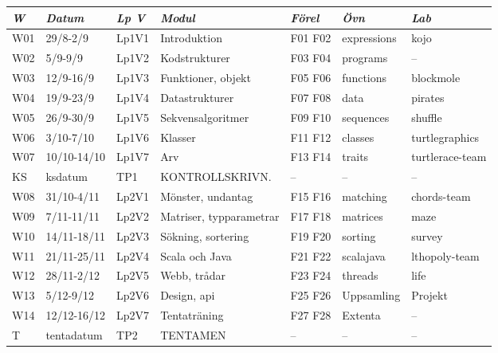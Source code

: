\begin{tabular}{l|l|l|l|l|l|l}
\textit{W} & \textit{Datum} & \textit{Lp V} & \textit{Modul} & \textit{Förel} & \textit{Övn} & \textit{Lab} \\ \hline \hline
W01 & 29/8-2/9 & Lp1V1 & Introduktion & F01 F02 & expressions & kojo \\
W02 & 5/9-9/9 & Lp1V2 & Kodstrukturer & F03 F04 & programs & -- \\
W03 & 12/9-16/9 & Lp1V3 & Funktioner, objekt & F05 F06 & functions & blockmole \\
W04 & 19/9-23/9 & Lp1V4 & Datastrukturer & F07 F08 & data & pirates \\
W05 & 26/9-30/9 & Lp1V5 & Sekvensalgoritmer & F09 F10 & sequences & shuffle \\
W06 & 3/10-7/10 & Lp1V6 & Klasser & F11 F12 & classes & turtlegraphics \\
W07 & 10/10-14/10 & Lp1V7 & Arv & F13 F14 & traits & turtlerace-team \\
KS & ksdatum & TP1 & KONTROLLSKRIVN. & -- & -- & -- \\
W08 & 31/10-4/11 & Lp2V1 & Mönster, undantag & F15 F16 & matching & chords-team \\
W09 & 7/11-11/11 & Lp2V2 & Matriser, typparametrar & F17 F18 & matrices & maze \\
W10 & 14/11-18/11 & Lp2V3 & Sökning, sortering & F19 F20 & sorting & survey \\
W11 & 21/11-25/11 & Lp2V4 & Scala och Java & F21 F22 & scalajava & lthopoly-team \\
W12 & 28/11-2/12 & Lp2V5 & Webb, trådar & F23 F24 & threads & life \\
W13 & 5/12-9/12 & Lp2V6 & Design, api & F25 F26 & Uppsamling & Projekt \\
W14 & 12/12-16/12 & Lp2V7 & Tentaträning & F27 F28 & Extenta & -- \\
T & tentadatum & TP2 & TENTAMEN & -- & -- & -- \\
\end{tabular}
